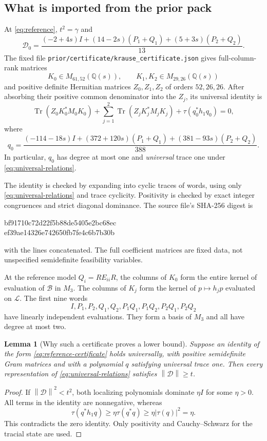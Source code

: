 \documentclass[11pt]{article}
\newtheorem{lemma}[theorem]{Lemma}
\theoremstyle{remark}\newtheorem{remark}[theorem]{Remark}
\newcommand{\Q}{\mathbb Q}
\newcommand{\Tr}{\operatorname{Tr}}
\newcommand{\norm}[1]{\left\lVert#1\right\rVert}
\newcommand{\Bwords}{\mathcal B}
\newcommand{\Lwords}{\mathcal L}
\begin{document}
\subsection{What is imported from the prior pack}
At \eqref{eq:reference}, $t^2=\gamma$ and
\[
 \mathcal D_0=\frac{(-2+4s)I+(14-2s)(P_1+Q_1)+(5+3s)(P_2+Q_2)}{13}.
\]
The fixed file \texttt{prior/certificate/krause\_certificate.json} gives full-column-rank matrices
\[
 K_0\in M_{61,52}(\Q(s)),\qquad K_1,K_2\in M_{29,26}(\Q(s))
\]
and positive definite Hermitian matrices $Z_0,Z_1,Z_2$ of orders $52,26,26$. After absorbing their positive common denominator into the $Z_j$, its universal identity is
\begin{equation}\label{eq:reference-certificate}
 \Tr(Z_0K_0^*M_0K_0)+\sum_{j=1}^2\Tr(Z_jK_j^*M_jK_j)
 +\tau(q_0^*h_1q_0)=0,
\end{equation}
where
\begin{equation}\label{eq:q0}
 q_0=\frac{(-114-18s)I+(372+120s)(P_1+Q_1)+(381-93s)(P_2+Q_2)}{388}.
\end{equation}
In particular, $q_0$ has degree at most one and \emph{universal} trace one under \eqref{eq:universal-relations}.

The identity is checked by expanding into cyclic traces of words, using only \eqref{eq:universal-relations} and trace cyclicity. Positivity is checked by exact integer congruences and strict diagonal dominance. The source file's SHA-256 digest is
\begin{center}\small\ttfamily
bf91710c72d22f5b88de5405e2bc68ec\\
ef39ae14326e742650fb7fe4c6b7b30b
\end{center}
with the lines concatenated. The full coefficient matrices are fixed data, not unspecified semidefinite feasibility variables.

At the reference model $Q_i=RE_{ii}R$, the columns of $K_0$ form the entire kernel of evaluation of $\Bwords$ in $M_3$. The columns of $K_j$ form the kernel of $p\mapsto h_jp$ evaluated on $\Lwords$. The first nine words
\begin{equation}\label{eq:nine}
 I,P_1,P_2,Q_1,Q_2,P_1Q_1,P_1Q_2,P_2Q_1,P_2Q_2
\end{equation}
have linearly independent evaluations. They form a basis of $M_3$ and all have degree at most two.

\begin{lemma}[Why such a certificate proves a lower bound]\label{lem:certificate-lower}
Suppose an identity of the form \eqref{eq:reference-certificate} holds universally, with positive semidefinite Gram matrices and with a polynomial $q$ satisfying universal trace one. Then every representation of \eqref{eq:universal-relations} satisfies $\norm{\mathcal D}\ge t$.
\end{lemma}
\begin{proof}
If $\norm{\mathcal D}^2<t^2$, both localizing polynomials dominate $\eta I$ for some $\eta>0$. All terms in the identity are nonnegative, whereas
\[
 \tau(q^*h_1q)\ge\eta\tau(q^*q)\ge\eta|\tau(q)|^2=\eta.
\]
This contradicts the zero identity. Only positivity and Cauchy--Schwarz for the tracial state are used.
\end{proof}
\end{document}
